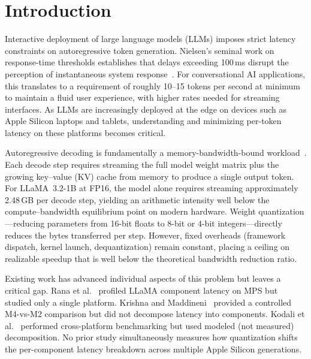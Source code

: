 \documentclass[conference]{IEEEtran}
\begin{document}
\section{Introduction}

Interactive deployment of large language models (LLMs) imposes strict latency constraints on autoregressive token generation. Nielsen's seminal work on response-time thresholds establishes that delays exceeding 100\,ms disrupt the perception of instantaneous system response~\cite{nielsen1993}. For conversational AI applications, this translates to a requirement of roughly 10--15 tokens per second at minimum to maintain a fluid user experience, with higher rates needed for streaming interfaces. As LLMs are increasingly deployed at the edge on devices such as Apple Silicon laptops and tablets, understanding and minimizing per-token latency on these platforms becomes critical.

Autoregressive decoding is fundamentally a memory-bandwidth-bound workload~\cite{williams2009}. Each decode step requires streaming the full model weight matrix plus the growing key--value (KV) cache from memory to produce a single output token. For LLaMA~3.2-1B at FP16, the model alone requires streaming approximately 2.48\,GB per decode step, yielding an arithmetic intensity well below the compute--bandwidth equilibrium point on modern hardware. Weight quantization---reducing parameters from 16-bit floats to 8-bit or 4-bit integers---directly reduces the bytes transferred per step. However, fixed overheads (framework dispatch, kernel launch, dequantization) remain constant, placing a ceiling on realizable speedup that is well below the theoretical bandwidth reduction ratio.

Existing work has advanced individual aspects of this problem but leaves a critical gap. Rana et al.~\cite{rana2025} profiled LLaMA component latency on MPS but studied only a single platform. Krishna and Maddineni~\cite{krishna2025} provided a controlled M4-vs-M2 comparison but did not decompose latency into components. Kodali et al.~\cite{kodali2025} performed cross-platform benchmarking but used modeled (not measured) decomposition. No prior study simultaneously measures how quantization shifts the per-component latency breakdown across multiple Apple Silicon generations.
\end{document}
